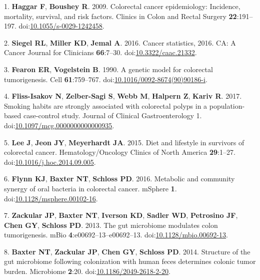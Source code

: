 \documentclass[11pt,]{article}
\begin{document}
\hypertarget{refs}{}
\leavevmode\hypertarget{ref-Haggar2009}{}%
1. \textbf{Haggar F}, \textbf{Boushey R}. 2009. Colorectal cancer
epidemiology: Incidence, mortality, survival, and risk factors. Clinics
in Colon and Rectal Surgery \textbf{22}:191--197.
doi:\href{https://doi.org/10.1055/s-0029-1242458}{10.1055/s-0029-1242458}.

\leavevmode\hypertarget{ref-Siegel2016}{}%
2. \textbf{Siegel RL}, \textbf{Miller KD}, \textbf{Jemal A}. 2016.
Cancer statistics, 2016. CA: A Cancer Journal for Clinicians
\textbf{66}:7--30.
doi:\href{https://doi.org/10.3322/caac.21332}{10.3322/caac.21332}.

\leavevmode\hypertarget{ref-Fearon1990}{}%
3. \textbf{Fearon ER}, \textbf{Vogelstein B}. 1990. A genetic model for
colorectal tumorigenesis. Cell \textbf{61}:759--767.
doi:\href{https://doi.org/10.1016/0092-8674(90)90186-i}{10.1016/0092-8674(90)90186-i}.

\leavevmode\hypertarget{ref-FlissIsakov2017}{}%
4. \textbf{Fliss-Isakov N}, \textbf{Zelber-Sagi S}, \textbf{Webb M},
\textbf{Halpern Z}, \textbf{Kariv R}. 2017. Smoking habits are strongly
associated with colorectal polyps in a population-based case-control
study. Journal of Clinical Gastroenterology 1.
doi:\href{https://doi.org/10.1097/mcg.0000000000000935}{10.1097/mcg.0000000000000935}.

\leavevmode\hypertarget{ref-Lee2015}{}%
5. \textbf{Lee J}, \textbf{Jeon JY}, \textbf{Meyerhardt JA}. 2015. Diet
and lifestyle in survivors of colorectal cancer. Hematology/Oncology
Clinics of North America \textbf{29}:1--27.
doi:\href{https://doi.org/10.1016/j.hoc.2014.09.005}{10.1016/j.hoc.2014.09.005}.

\leavevmode\hypertarget{ref-Flynn2016}{}%
6. \textbf{Flynn KJ}, \textbf{Baxter NT}, \textbf{Schloss PD}. 2016.
Metabolic and community synergy of oral bacteria in colorectal cancer.
mSphere \textbf{1}.
doi:\href{https://doi.org/10.1128/msphere.00102-16}{10.1128/msphere.00102-16}.

\leavevmode\hypertarget{ref-Zackular2013}{}%
7. \textbf{Zackular JP}, \textbf{Baxter NT}, \textbf{Iverson KD},
\textbf{Sadler WD}, \textbf{Petrosino JF}, \textbf{Chen GY},
\textbf{Schloss PD}. 2013. The gut microbiome modulates colon
tumorigenesis. mBio \textbf{4}:e00692--13--e00692--13.
doi:\href{https://doi.org/10.1128/mbio.00692-13}{10.1128/mbio.00692-13}.

\leavevmode\hypertarget{ref-Baxter2014}{}%
8. \textbf{Baxter NT}, \textbf{Zackular JP}, \textbf{Chen GY},
\textbf{Schloss PD}. 2014. Structure of the gut microbiome following
colonization with human feces determines colonic tumor burden.
Microbiome \textbf{2}:20.
doi:\href{https://doi.org/10.1186/2049-2618-2-20}{10.1186/2049-2618-2-20}.
\end{document}
